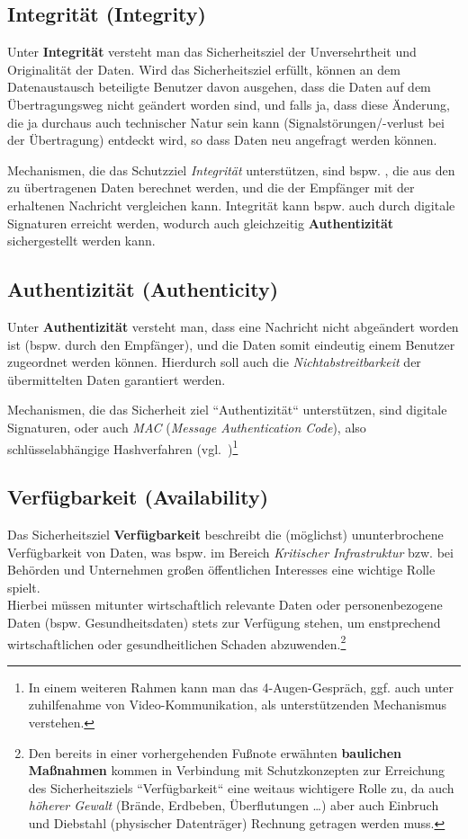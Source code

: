 \subsection*{Integrität (Integrity)}
Unter \textbf{Integrität} versteht man das Sicherheitsziel der Unversehrtheit und Originalität der Daten.
Wird das Sicherheitsziel erfüllt, können an dem Datenaustausch beteiligte Benutzer davon ausgehen, dass die Daten auf dem Übertragungsweg nicht geändert worden sind, und falls ja, dass diese Änderung, die ja durchaus auch technischer Natur sein kann (Signalstörungen/-verlust bei der Übertragung) entdeckt wird, so dass Daten neu angefragt werden können.

\noindent
Mechanismen, die das Schutzziel \textit{Integrität} unterstützen, sind bspw. , die aus den zu übertragenen Daten berechnet werden, und die der Empfänger mit der erhaltenen Nachricht vergleichen kann.
Integrität kann bspw. auch durch digitale Signaturen erreicht werden, wodurch auch gleichzeitig \textbf{Authentizität} sichergestellt werden kann.

\subsection*{Authentizität (Authenticity)}
Unter \textbf{Authentizität} versteht man, dass eine Nachricht nicht abgeändert worden ist (bspw. durch den Empfänger), und die Daten somit eindeutig einem Benutzer zugeordnet werden können. Hierdurch soll auch die \textit{Nichtabstreitbarkeit} der übermittelten Daten garantiert werden.

\noindent
Mechanismen, die das Sicherheit ziel ``Authentizität`` unterstützen, sind digitale Signaturen, oder auch \textit{MAC} (\textit{Message Authentication Code}), also schlüsselabhängige Hashverfahren (vgl.~\cite{Sch15})\footnote{
In einem weiteren Rahmen kann man das 4-Augen-Gespräch, ggf. auch unter zuhilfenahme von Video-Kommunikation, als unterstützenden Mechanismus verstehen.}

\subsection*{Verfügbarkeit (Availability)}
Das Sicherheitsziel \textbf{Verfügbarkeit} beschreibt die (möglichst) ununterbrochene Verfügbarkeit von Daten, was bspw. im Bereich \textit{Kritischer Infrastruktur} bzw. bei Behörden und Unternehmen großen öffentlichen Interesses eine wichtige Rolle spielt.\\
Hierbei müssen mitunter wirtschaftlich relevante Daten oder personenbezogene Daten (bspw. Gesundheitsdaten) stets zur Verfügung stehen, um enstprechend wirtschaftlichen oder gesundheitlichen Schaden abzuwenden.\footnote{
Den bereits in einer vorhergehenden Fußnote erwähnten \textbf{baulichen Maßnahmen} kommen in Verbindung mit Schutzkonzepten zur Erreichung des Sicherheitsziels ``Verfügbarkeit`` eine weitaus wichtigere Rolle zu, da auch \textit{höherer Gewalt} (Brände, Erdbeben, Überflutungen \ldots) aber auch Einbruch und Diebstahl (physischer Datenträger) Rechnung getragen werden muss.
}

